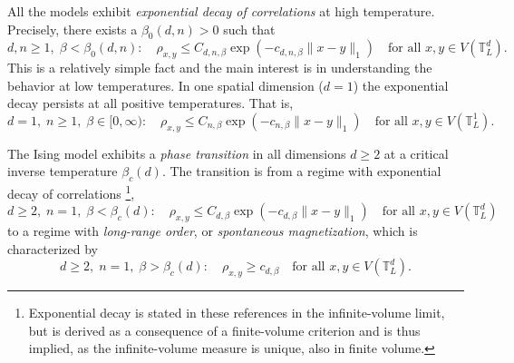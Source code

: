 \documentclass[12pt,reqno]{article}
\def\T{\mathbb{T}}
\begin{document}
\medbreak
{} All the models
exhibit \emph{exponential decay of correlations} at high
temperature. Precisely, there exists a $\beta_0(d,n)>0$ such that
\begin{equation}\label{eq:exponential_decay_high_temperatures}
  d,n\ge 1,\; \beta<\beta_0(d,n)\colon\quad \rho_{x,y} \le C_{d,n,\beta}\exp(-c_{d,n,\beta}\|x-y\|_1)\quad\text{for all $x,y\in V(\T_L^d)$}.
\end{equation}
This is a relatively simple fact and the main interest is in
understanding the behavior at low temperatures. In one spatial
dimension ($d=1$) the exponential decay persists at all positive
temperatures. That is,
  \begin{equation}\label{eq:exponential_decay_1d}
    d=1,\; n\ge 1,\; \beta\in[0,\infty)\colon\quad \rho_{x,y} \le C_{n,\beta}\exp(-c_{n,\beta}\|x-y\|_1)\quad\text{for all $x,y\in V(\T_L^1)$}.
  \end{equation}


\medbreak
{}
The Ising model exhibits a \emph{phase
transition} in all dimensions $d\ge 2$ at a critical inverse temperature
$\beta_c(d)$. The transition is from a regime with exponential decay
of correlations \cite{aizenman1985absence,Aiz85Rig,AizBarFer87, duminil2016new,duminil2017sharp}\footnote{Exponential decay is stated in these references in the infinite-volume limit, but is derived as a consequence of a finite-volume criterion and is thus implied, as the infinite-volume measure is unique, also in finite volume.},
\begin{equation*}
  d\ge 2,\; n=1,\; \beta<\beta_c(d)\colon\quad \rho_{x,y} \le C_{d,\beta}\exp(-c_{d,\beta}\|x-y\|_1)\quad\text{for all $x,y\in V(\T_L^d)$}
\end{equation*}
to a regime with \emph{long-range order}, or
\emph{spontaneous magnetization}, which is characterized by
\begin{equation*}
  d\ge 2,\; n=1,\; \beta>\beta_c(d)\colon\quad\rho_{x,y} \ge c_{d,\beta}\quad\text{for all $x,y\in V(\T_L^d)$}.
\end{equation*}
\end{document}
